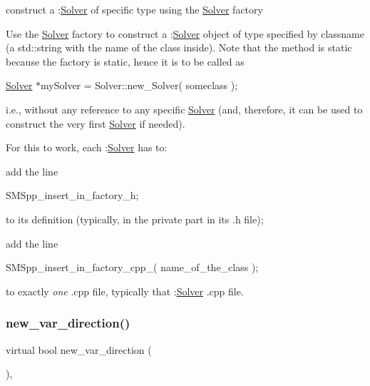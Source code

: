 construct a \+:\mbox{\hyperlink{class_s_m_spp__di__unipi__it_1_1_solver}{Solver}} of specific type using the \mbox{\hyperlink{class_s_m_spp__di__unipi__it_1_1_solver}{Solver}} factory 

Use the \mbox{\hyperlink{class_s_m_spp__di__unipi__it_1_1_solver}{Solver}} factory to construct a \+:\mbox{\hyperlink{class_s_m_spp__di__unipi__it_1_1_solver}{Solver}} object of type specified by classname (a std\+::string with the name of the class inside). Note that the method is static because the factory is static, hence it is to be called as

\mbox{\hyperlink{class_s_m_spp__di__unipi__it_1_1_solver}{Solver}} $\ast$my\+Solver = Solver\+::new\+\_\+\+Solver( someclass );

i.\+e., without any reference to any specific \mbox{\hyperlink{class_s_m_spp__di__unipi__it_1_1_solver}{Solver}} (and, therefore, it can be used to construct the very first \mbox{\hyperlink{class_s_m_spp__di__unipi__it_1_1_solver}{Solver}} if needed).

For this to work, each \+:\mbox{\hyperlink{class_s_m_spp__di__unipi__it_1_1_solver}{Solver}} has to\+:


\begin{DoxyItemize}
\item add the line

S\+M\+Spp\+\_\+insert\+\_\+in\+\_\+factory\+\_\+h;

to its definition (typically, in the private part in its .h file);
\item add the line

S\+M\+Spp\+\_\+insert\+\_\+in\+\_\+factory\+\_\+cpp\+\_( name\+\_\+of\+\_\+the\+\_\+class );

to exactly {\itshape one} .cpp file, typically that \+:\mbox{\hyperlink{class_s_m_spp__di__unipi__it_1_1_solver}{Solver}} .cpp file. 
\end{DoxyItemize}\mbox{\label{class_s_m_spp__di__unipi__it_1_1_solver_a673fc1c81a1fc86e55dfab3a37f303bc}} 
\subsubsection{\texorpdfstring{new\+\_\+var\+\_\+direction()}{new\_var\_direction()}}
{\footnotesize\ttfamily virtual bool new\+\_\+var\+\_\+direction (\begin{DoxyParamCaption}\item[{void}]{ }\end{DoxyParamCaption})\hspace{0.3cm}{\ttfamily [inline]}, {\ttfamily [virtual]}}



